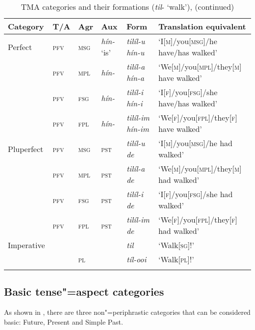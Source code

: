 \addtocounter{table}{-1}
\begin{sidewaystable}[p!]
\caption{TMA categories and their formations (\textit{til}- `walk'), (continued)}
\begin{tabularx}{\textwidth}{ l l l l l l }
\lsptoprule
Category &
T/A &
Agr &
Aux &
Form &
Translation equivalent\\\hline
Perfect &
\textsc{pfv} &
\textsc{msg} &
\textit{hín-} `is' &
\textit{tilíl-u hín-u} &
`I[\textsc{m}]/you[\textsc{msg}]/he have/has walked' \\
&
\textsc{pfv} &
\textsc{mpl} &
\textit{hín-} &
\textit{tilíl-a hín-a} &
`We[\textsc{m}]/you[\textsc{mpl}]/they[\textsc{m}] have walked' \\
&
\textsc{pfv} &
\textsc{fsg} &
\textit{hín-} &
\textit{tilíl-i hín-i} &
`I[\textsc{f}]/you[\textsc{fsg}]/she have/has walked' \\
&
\textsc{pfv} &
\textsc{fpl} &
\textit{hín-} &
\textit{tilíl-im hín-im} &
`We[\textsc{f}]/you[\textsc{fpl}]/they[\textsc{f}] have walked' \\
Pluperfect &
\textsc{pfv} &
\textsc{msg} &
\textsc{pst} &
\textit{tilíl-u de} &
`I[\textsc{m}]/you[\textsc{msg}]/he had walked' \\
&
\textsc{pfv} &
\textsc{mpl} &
\textsc{pst} &
\textit{tilíl-a de} &
`We[\textsc{m}]/you[\textsc{mpl}]/they[\textsc{m}] had walked' \\
&
\textsc{pfv} &
\textsc{fsg} &
\textsc{pst} &
\textit{tilíl-i de} &
`I[\textsc{f}]/you[\textsc{fsg}]/she had walked' \\
&
\textsc{pfv} &
\textsc{fpl} &
\textsc{pst} &
\textit{tilíl-im de} &
`We[\textsc{f}]/you[\textsc{fpl}]/they[\textsc{f}] had walked' \\
Imperative &
&
&
&
\textit{til} &
`Walk[\textsc{sg}]!' \\
&
&
\textsc{pl} &
&
\textit{tíl-ooi} &
`Walk[\textsc{pl}]!' 
\\\lspbottomrule
\end{tabularx}
\label{tab:9-1b}
\end{sidewaystable}


\subsection{Basic tense"=aspect categories}
\label{subsec:9-1-1}


As shown in , there are three non"=periphrastic categories that can be considered basic: Future, Present and Simple Past.

